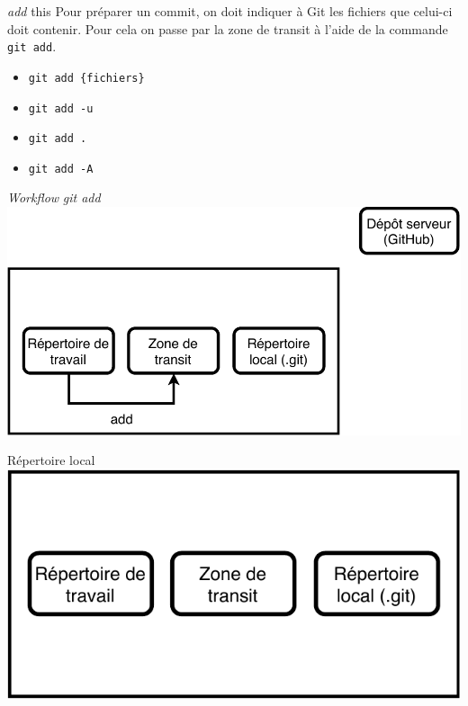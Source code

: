 \documentclass[11pt]{beamer}
\begin{document}
\begin{frame}[fragile]{\textit{add} this}
	Pour préparer un commit, on doit indiquer à Git les fichiers que celui-ci doit contenir. Pour cela on passe par la zone de transit à l'aide de la commande \verb|git add|.
	
	\begin{itemize}[<+->]
		\item \verb|git add {fichiers}|
		\item \verb|git add -u|
		\item \verb|git add .|
		\item \verb|git add -A|
	\end{itemize}
\end{frame}

\begin{frame}{\textit{Workflow} \textit{git add}}
	\includegraphics[width=0.95\linewidth,height=0.95\textheight,keepaspectratio]{add.pdf}
\end{frame}

\begin{frame}{Répertoire local}
	\includegraphics[width=0.95\linewidth,height=0.95\textheight,keepaspectratio]{stage.pdf}
\end{frame}
\end{document}
